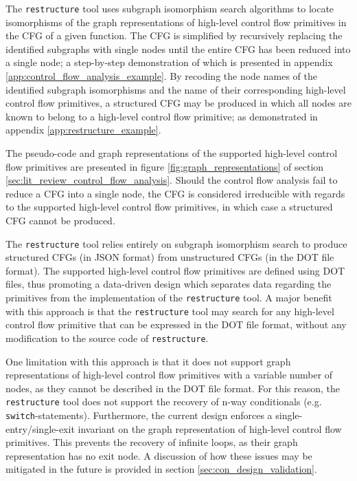 The \texttt{restructure} tool uses subgraph isomorphism search algorithms to locate isomorphisms of the graph representations of high-level control flow primitives in the CFG of a given function. The CFG is simplified by recursively replacing the identified subgraphs with single nodes until the entire CFG has been reduced into a single node; a step-by-step demonstration of which is presented in appendix \ref{app:control_flow_analysis_example}. By recoding the node names of the identified subgraph isomorphisms and the name of their corresponding high-level control flow primitives, a structured CFG may be produced in which all nodes are known to belong to a high-level control flow primitive; as demonstrated in appendix \ref{app:restructure_example}.

The pseudo-code and graph representations of the supported high-level control flow primitives are presented in figure \ref{fig:graph_representations} of section \ref{sec:lit_review_control_flow_analysis}. Should the control flow analysis fail to reduce a CFG into a single node, the CFG is considered irreducible with regards to the supported high-level control flow primitives, in which case a structured CFG cannot be produced.

The \texttt{restructure} tool relies entirely on subgraph isomorphism search to produce structured CFGs (in JSON format) from unstructured CFGs (in the DOT file format). The supported high-level control flow primitives are defined using DOT files, thus promoting a data-driven design which separates data regarding the primitives from the implementation of the \texttt{restructure} tool. A major benefit with this approach is that the \texttt{restructure} tool may search for any high-level control flow primitive that can be expressed in the DOT file format, without any modification to the source code of \texttt{restructure}.

One limitation with this approach is that it does not support graph representations of high-level control flow primitives with a variable number of nodes, as they cannot be described in the DOT file format. For this reason, the \texttt{restructure} tool does not support the recovery of n-way conditionals (e.g. \texttt{switch}-statements). Furthermore, the current design enforces a single-entry/single-exit invariant on the graph representation of high-level control flow primitives. This prevents the recovery of infinite loops, as their graph representation has no exit node. A discussion of how these issues may be mitigated in the future is provided in section \ref{sec:con_design_validation}.
